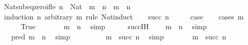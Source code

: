 \begin{isabellebody}
\ Nat{\isacharunderscore}{\kern0pt}sub{\isacharunderscore}{\kern0pt}eq{\isacharunderscore}{\kern0pt}zero{\isacharunderscore}{\kern0pt}if{\isacharunderscore}{\kern0pt}le{\isacharcolon}{\kern0pt}\ {\isachardoublequoteopen}n\ {\isacharcolon}{\kern0pt}\ Nat\ {\isasymLongrightarrow}\ m\ {\isasymle}\ n\ {\isasymLongrightarrow}\ m\ {\isacharminus}{\kern0pt}\ n\ {\isacharequal}{\kern0pt}\ {}{\isachardoublequoteclose}\isanewline
%
\isadelimproof
%
\endisadelimproof
%
\isatagproof
{}\isamarkupfalse%
\ {\isacharparenleft}{\kern0pt}induction\ n\ arbitrary{\isacharcolon}{\kern0pt}\ m\ rule{\isacharcolon}{\kern0pt}\ Nat{\isacharunderscore}{\kern0pt}induct{\isacharparenright}{\kern0pt}\isanewline
\ \ \isamarkupfalse%
\ {\isacharparenleft}{\kern0pt}succ\ n{\isacharparenright}{\kern0pt}\isanewline
\ \ \isamarkupfalse%
\ \isamarkupfalse%
\ {\isacharquery}{\kern0pt}case\isanewline
\ \ \isamarkupfalse%
\ {\isacharparenleft}{\kern0pt}cases\ {\isachardoublequoteopen}m\ {\isacharequal}{\kern0pt}\ {}{\isachardoublequoteclose}{\isacharparenright}{\kern0pt}\isanewline
\ \ \ \ \isamarkupfalse%
\ True\isanewline
\ \ \ \ \isamarkupfalse%
\ \isamarkupfalse%
\ {\isachardoublequoteopen}m\ {\isasymle}\ n{\isachardoublequoteclose}\ \isamarkupfalse%
\ simp\isanewline
\ \ \ \ \isamarkupfalse%
\ succ{\isachardot}{\kern0pt}IH\ \isamarkupfalse%
\ {\isachardoublequoteopen}{}\ {\isacharequal}{\kern0pt}\ m\ {\isacharminus}{\kern0pt}\ n{\isachardoublequoteclose}\ \isamarkupfalse%
\ simp\isanewline
\ \ \ \ \isamarkupfalse%
\ \isamarkupfalse%
\ {\isachardoublequoteopen}{}\ {\isacharequal}{\kern0pt}\ pred\ {\isacharparenleft}{\kern0pt}m\ {\isacharminus}{\kern0pt}\ n{\isacharparenright}{\kern0pt}{\isachardoublequoteclose}\ \isamarkupfalse%
\ simp\isanewline
\ \ \ \ \isamarkupfalse%
\ \isamarkupfalse%
\ {\isachardoublequoteopen}{\isachardot}{\kern0pt}{\isachardot}{\kern0pt}{\isachardot}{\kern0pt}\ {\isacharequal}{\kern0pt}\ m\ {\isacharminus}{\kern0pt}\ succ\ n{\isachardoublequoteclose}\ \isamarkupfalse%
\ simp\isanewline
\ \ \ \ \isamarkupfalse%
\ \isamarkupfalse%
\ {\isachardoublequoteopen}m\ {\isacharminus}{\kern0pt}\ succ\ n\ {\isacharequal}{\kern0pt}\ {}{\isachardoublequoteclose}\ \isamarkupfalse%

\end{isabellebody}
